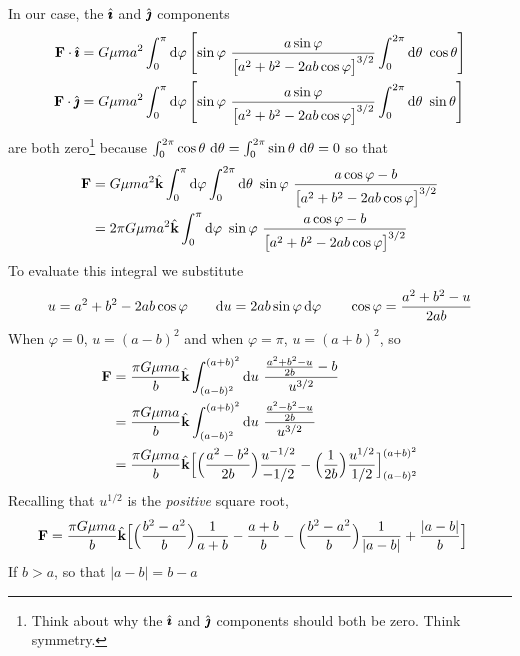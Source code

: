 \begin{eg}
In our case,
the $\hat{\pmb{\imath}}$ and $\hat{\pmb{\jmath}}$ components 
\begin{align*}
\vF\cdot\hi & = G\mu m a^2 \int_0^\pi\dee{\varphi} \left[
\sin\varphi\ 
    \frac{a\sin\varphi}
         {\big[a^2+b^2 -2ab\cos\varphi\big]^{3/2}}
\int_0^{2\pi}\dee{\theta}\ \cos\theta
\right] \\
\vF\cdot\hj & = G\mu m a^2\int_0^\pi\dee{\varphi}\left[
 \sin\varphi\ 
    \frac{a\sin\varphi}
         {\big[a^2+b^2 -2ab\cos\varphi\big]^{3/2}}
\int_0^{2\pi}\dee{\theta}\ \sin\theta
\right]
\end{align*}
are both zero\footnote{Think about why the $\hat{\pmb{\imath}}$ and $\hat{\pmb{\jmath}}$ components
should both be zero. Think symmetry.} because
$\int_0^{2\pi}\cos\theta\ \mathrm{d}\theta
           =\int_0^{2\pi}\sin\theta\ \mathrm{d}\theta
           =0$
so that
\begin{align*}
\vF 
&=  G\mu m a^2 \hk\int_0^\pi\dee{\varphi} \int_0^{2\pi}\dee{\theta}\ \sin\varphi\ 
    \frac{a\cos\varphi-b}
         {\big[a^2+b^2 -2ab\cos\varphi\big]^{3/2}} \\
&=  2\pi G\mu m a^2 \hk\int_0^\pi\dee{\varphi}\ \sin\varphi\ 
    \frac{a\cos\varphi-b}
         {\big[a^2+b^2 -2ab\cos\varphi\big]^{3/2}}
\end{align*}
To evaluate this integral we substitute
\begin{align*}
u=a^2+b^2 -2ab\cos\varphi\qquad
\mathrm{d}u = 2ab\sin\varphi\,\mathrm{d}\varphi\qquad
\cos\varphi = \frac{a^2+b^2-u}{2ab}
\end{align*}
When $\varphi=0$, $u=(a-b)^2$ and when $\varphi =\pi$, $u=(a+b)^2$, so
\begin{align*}
\mathbf{F} 
&=  \frac{\pi G\mu m a}{b} \hat{\mathbf{k}}\int_{(a-b)^2}^{(a+b)^2} 
     \mathrm{d}u\  \frac{\frac{a^2+b^2-u}{2b}-b}  {u^{3/2}} \\
&=  \frac{\pi G\mu m a}{b} \hat{\mathbf{k}}\int_{(a-b)^2}^{(a+b)^2} 
     \mathrm{d}u\  \frac{\frac{a^2-b^2-u}{2b}}  {u^{3/2}} \\
&=  \frac{\pi G\mu m a}{b} \hat{\mathbf{k}}\Big[ 
      \Big(\frac{a^2-b^2}{2b}\Big)\frac{u^{-1/2}}{-1/2}
            -\Big(\frac{1}{2b}\Big)\frac{u^{1/2}}{1/2}
   \Big]_{(a-b)^2}^{(a+b)^2}
\end{align*}
Recalling that $u^{1/2}$ is the \emph{positive} square root,
\begin{align*}
\mathbf{F}&=\frac{\pi G\mu m a}{b} \hat{\mathbf{k}}\Big[ 
      \Big(\frac{b^2-a^2}{b}\Big)\frac{1}{a+b}
            -\frac{a+b}{b}
            -\Big(\frac{b^2-a^2}{b}\Big)\frac{1}{|a-b|}
            +\frac{|a-b|}{b}
   \Big]
\end{align*}
If $b>a$, so that $|a-b|=b-a$

\end{eg}
